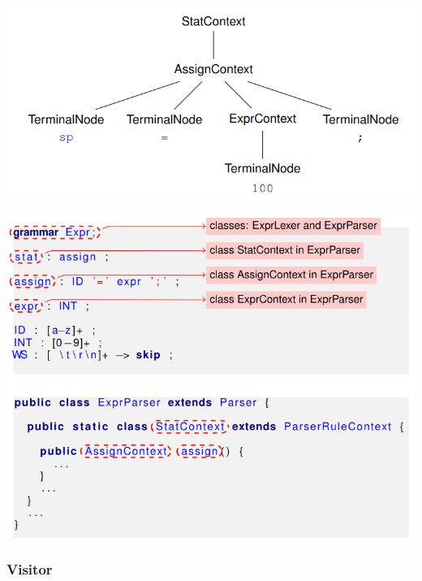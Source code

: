 \documentclass{article}
\begin{document}
\begin{flushleft}
  \begin{center}
    \includegraphics[scale=0.35]{26}
  \end{center}


  \begin{center}
    \includegraphics[scale=0.3]{27}
  \end{center}
\end{flushleft}

\subsubsection{Visitor}
\end{document}
